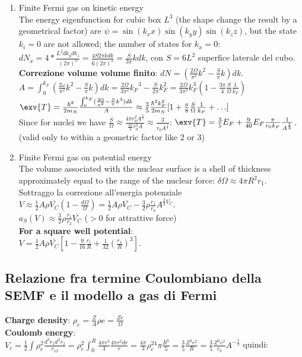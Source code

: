 \begin{enumerate}
\item Finite Fermi gas on kinetic energy\\
The energy eigenfunction for cubic box $L^3$ (the shape change the result by a geometrical factor)  are $\psi=\sin{(k_xx)}\sin{(k_yy)}\sin{(k_zz)}$, but the state $k_i=0$ are not allowed; the number of states for $k_x=0$: $dN_x=4*\frac{L^2dk_ydk_z}{(2\pi)^2}=\frac{4S2\pi kdk}{6(2\pi)^2}=\frac{S}{3\pi}kdk$, con $S=6L^2$ superfice laterale del cubo.\\
\textbf{Correzione volume volume finito}: $dN=(\frac{2\Omega}{\pi^2}k^2-\frac{S}{\pi}k)dk$.
$A=\int_0^{k_F}(\frac{2\omega}{\pi^2}k^2-\frac{S}{\pi}k)dk=\frac{2\Omega}{3\pi^2}{k_F}^3-\frac{S}{2\pi}k_F^2=\frac{2\Omega}{3\pi^2}k_F^3(1-\frac{3\pi}{4}\frac{S}{\Omega}\frac{1}{k_F})$\\
$\exv{T}=\frac{\hbar^2}{2m_N}\frac{\int_0^{k_F}(\frac{2\Omega}{\pi^2}-\frac{S}{\pi}k^3)dk}{A}\approx\frac{3}{5}\frac{\hbar^2k_F^2}{2m_N}[1+\frac{\pi}{8}\frac{S}{\Omega}\frac{1}{k_F}+\ldots]$\\
Since for nuclei we have $\frac{S}{\Omega}\approx\frac{4\pi r_0^2A^{\frac{2}{3}}}{\frac{4\pi}{3}r_0^3A}\approx\frac{3}{r_0A^{\frac{1}{3}}}$: $\exv{T}=\frac{3}{5}E_F+\frac{9}{40}E_F\frac{\pi}{r_0k_F}\frac{1}{A^{\frac{1}{3}}}$.\\
 (valid only to within a geometric factor like 2 or 3)\\

\item Finite Fermi gas on potential energy\\
The volume associated with the nuclear surface is a shell of thickness approximately equal to the range of the nuclear force: $\delta\Omega\approx4\pi R^2r_1$.\\
Sottraggo la correzione all'energia potenziale $V\approx\frac{1}{2}A\rho\overline{V_C}(1-\frac{d\Omega}{\Omega})=\frac{1}{2}A\rho\overline{V_C}-\frac{3}{2}\rho\frac{r_1}{r_0}A^{\frac{2}{3}\overline{V_C}}$.\\
$a_S(V)\approx\frac{3}{2}\rho\frac{r_1}{r_2}\overline{V_C}$ ($>0$ for attrattive force)\\
\textbf{For a square well potential}:\\
$V=\frac{1}{2}A\rho\overline{V_C}[1-\frac{9}{16}\frac{r_1}{R}+\frac{1}{32}(\frac{r_1}{R})^3]$.
\end{enumerate}

\subsection{Relazione fra termine Coulombiano della SEMF e il modello a gas di Fermi}
\textbf{Charge density}: $\rho_e=\frac{Z}{A}\rho e=\frac{Ze}{\Omega}$\\
\textbf{Coulomb energy}: $V_c=\frac{1}{2}\int\rho_e^2\frac{d^3r_1d^3r_2}{r_{12}}=\rho_e^2\int_0^R\frac{4\pi r^3}{3}\frac{4\pi r^2dr}{r}=\frac{4\pi}{3}\rho_e^24\pi\frac{R^5}{5}=\frac{3}{5}\frac{Z^2e^2}{R}=\frac{3}{5}\frac{Z^2e^2}{r_0}A^{-\frac{1}{3}}$ quindi:\\

